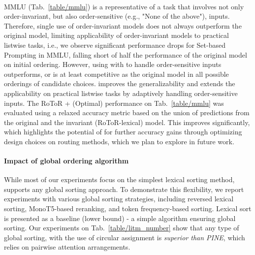 \paragraph{\sr{}} 
\label{results:other_analysis}
MMLU (Tab.~\ref{table/mmlu}) is a representative of a task that involves not only order-invariant, but also order-sensitive (e.g., "None of the above"), inputs. Therefore, single use of order-invariant models does not always outperform the original model, limiting applicability of order-invariant models to practical listwise tasks, i.e., we observe significant performance drops for Set-based Prompting in MMLU, falling short of half the performance of the original model on initial ordering. However, using \ours{} with \sr{} to handle order-sensitive inputs outperforms, or is at least competitive as the original model in all possible orderings of candidate choices. \sr{} improves the generalizability and extends the applicability on practical listwise tasks by adaptively handling order-sensitive inputs. The RoToR + \sr{} (Optimal) performance on Tab.~\ref{table/mmlu} was evaluated using a relaxed accuracy metric based on the union of predictions from the original and the invariant (RoToR-lexical) model. This improves significantly, which highlights the potential of \sr{} for further accuracy gains through optimizing design choices on routing methods, which we plan to explore in future work.

\paragraph{Impact of global ordering algorithm} While most of our experiments focus on the simplest lexical sorting method, \ours{} supports any global sorting approach. To demonstrate this flexibility, we report experiments with various global sorting strategies, including reversed lexical sorting, MonoT5-based reranking, and token frequency-based sorting. Lexical sort is presented as a baseline (lower bound) - a simple algorithm ensuring global sorting. Our experiments on Tab.~\ref{table/litm_number} show that any type of global sorting, with the use of circular assignment is \textit{superior than PINE}, which relies on pairwise attention arrangements.




